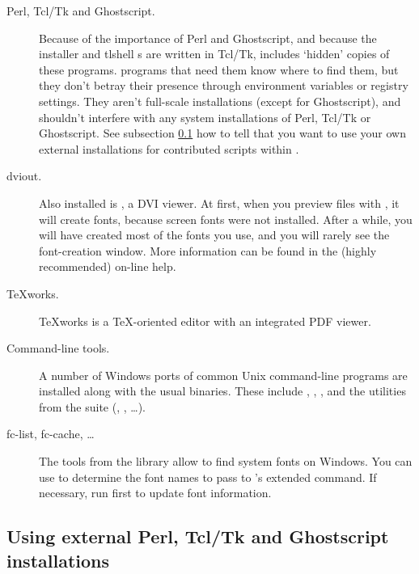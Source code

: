 \documentclass[12pt]{article}
\begin{document}
\begin{description}
\item[Perl, Tcl/Tk and Ghostscript.] Because of the importance of Perl and
  Ghostscript, and because the installer and tlshell \GUI{}s are written
  in Tcl/Tk, \TL{} includes `hidden' copies of these programs. \TL{}
  programs that need them know where to find them, but they don't betray
  their presence through environment variables or registry settings.
  They aren't full-scale installations (except for Ghostscript), and
  shouldn't interfere with any system installations of Perl, Tcl/Tk or
  Ghostscript. See subsection \ref{sec:externalwndws} how to tell \TL{} that
  you want to use your own external installations for contributed
  scripts within \TL.

\item[dviout.] Also installed is , a DVI viewer.
  At first, when you preview files with , it will create
  fonts, because screen fonts were not installed. After a while, you
  will have created most of the fonts you use, and you will rarely see
  the font-creation window.  More information can be found in the
  (highly recommended) on-line help.

\item[\TeX{}works.]  \TeX{}works is a \TeX-oriented editor with
  an integrated PDF viewer.

\item[Command-line tools.] A number of Windows ports of common Unix
  command-line programs are installed along with the usual \TL{}
  binaries. These include , ,
  , and the utilities from the  suite
  (, , \ldots).

\item[fc-list, fc-cache, \ldots] The tools from the 
  library allow \XeTeX{} to find system fonts on Windows. You can use
   to determine the font names to pass to \XeTeX's
  extended  command. If necessary, run  first to
  update font information.

\end{description}

\subsection{Using external Perl, Tcl/Tk and Ghostscript
  installations}
\label{sec:externalwndws}
\end{document}
